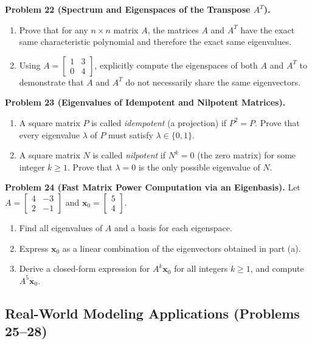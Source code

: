 \documentclass[11pt, letterpaper]{article}
\theoremstyle{definition}
\theoremstyle{remark}
\begin{document}
\textbf{Problem 22 (Spectrum and Eigenspaces of the Transpose $A^T$).}
\begin{enumerate}[label=(\alph*)]
    \item Prove that for any $n \times n$ matrix $A$, the matrices $A$ and $A^T$ have the exact same characteristic polynomial and therefore the exact same eigenvalues.
    \item Using $A = \begin{bmatrix} 1 & 3 \\ 0 & 4 \end{bmatrix}$, explicitly compute the eigenspaces of both $A$ and $A^T$ to demonstrate that $A$ and $A^T$ do not necessarily share the same eigenvectors.
\end{enumerate}

\textbf{Problem 23 (Eigenvalues of Idempotent and Nilpotent Matrices).}
\begin{enumerate}[label=(\alph*)]
    \item A square matrix $P$ is called \emph{idempotent} (a projection) if $P^2 = P$. Prove that every eigenvalue $\lambda$ of $P$ must satisfy $\lambda \in \{0, 1\}$.
    \item A square matrix $N$ is called \emph{nilpotent} if $N^k = 0$ (the zero matrix) for some integer $k \ge 1$. Prove that $\lambda = 0$ is the only possible eigenvalue of $N$.
\end{enumerate}

\textbf{Problem 24 (Fast Matrix Power Computation via an Eigenbasis).}
Let $A = \begin{bmatrix} 4 & -3 \\ 2 & -1 \end{bmatrix}$ and $\mathbf{x}_0 = \begin{bmatrix} 5 \\ 4 \end{bmatrix}$.
\begin{enumerate}[label=(\alph*)]
    \item Find all eigenvalues of $A$ and a basis for each eigenspace.
    \item Express $\mathbf{x}_0$ as a linear combination of the eigenvectors obtained in part (a).
    \item Derive a closed-form expression for $A^k \mathbf{x}_0$ for all integers $k \ge 1$, and compute $A^5 \mathbf{x}_0$.
\end{enumerate}

\subsection{Real-World Modeling Applications (Problems 25--28)}
\end{document}
